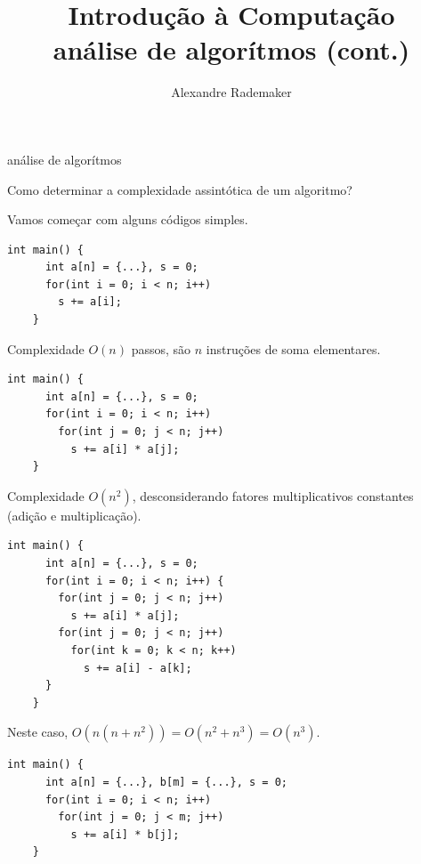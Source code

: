 \documentclass{beamer}
\title{Introdução à Computação \\ análise de algorítmos (cont.)}
\author{Alexandre Rademaker}
\date{}
\begin{document}
\begin{frame}
 \maketitle
\end{frame}

\begin{frame}{análise de algorítmos}

  Como determinar a complexidade assintótica de um algoritmo?

  Vamos começar com alguns códigos simples.

  \framebreak

  \begin{lstlisting}[style=normalc]
    int main() {
      int a[n] = {...}, s = 0;
      for(int i = 0; i < n; i++) 
        s += a[i];
    }
  \end{lstlisting}

  Complexidade $O(n)$ passos, são $n$ instruções de soma elementares.

  \framebreak

  \begin{lstlisting}[style=normalc]
    int main() {
      int a[n] = {...}, s = 0;
      for(int i = 0; i < n; i++) 
        for(int j = 0; j < n; j++) 
          s += a[i] * a[j];
    }
  \end{lstlisting}

  Complexidade $O(n^2)$, desconsiderando fatores multiplicativos
  constantes (adição e multiplicação).

  \framebreak

  \begin{lstlisting}[style=normalc]
    int main() {
      int a[n] = {...}, s = 0;
      for(int i = 0; i < n; i++) {
        for(int j = 0; j < n; j++) 
          s += a[i] * a[j];
        for(int j = 0; j < n; j++) 
          for(int k = 0; k < n; k++) 
            s += a[i] - a[k];
      }
    }
  \end{lstlisting}

  Neste caso, $O(n (n + n^2)) = O(n^2 + n^3) = O(n^3)$.
  

  \framebreak

  \begin{lstlisting}[style=normalc]
    int main() {
      int a[n] = {...}, b[m] = {...}, s = 0;
      for(int i = 0; i < n; i++) 
        for(int j = 0; j < m; j++) 
          s += a[i] * b[j];
    }
  \end{lstlisting}


\end{frame}
\end{document}
